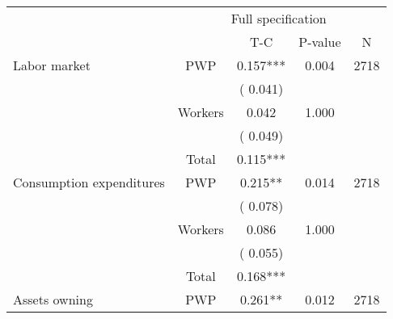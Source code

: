 
\begin{tabular}{l*{4}{c}}\hline&\multicolumn{4}{c}{Full specification} \\ \cmidrule(r){2-5} & {} & {T-C} & {P-value} & {N}  \\ \midrule
 Labor market                 &       PWP     &              0.157***                 &        0.004    & 2718                               \\  
                               &                               &       (       0.041)                              & &                                                                             \\ 
                               &       Workers         &              0.042                 &        1.000    &                                               \\ 
                               &                               &       (       0.049)                              & &                                                                             \\ 
\cmidrule{2-3}
                               &       Total           &              0.115***                 &    &                                               \\ 
\cmidrule{2-3}
 Consumption expenditures                 &       PWP     &              0.215**                 &        0.014    & 2718                               \\ 
                               &                               &       (       0.078)                              & &                                                                             \\ 
                               &       Workers         &              0.086                 &        1.000    &                                               \\ 
                               &                               &       (       0.055)                              & &                                                                             \\ 
\cmidrule{2-3}
                               &       Total           &              0.168***                 &    &                                               \\ 
\cmidrule{2-3}
 Assets owning                 &       PWP     &              0.261**                 &        0.012    & 2718                               \\ 

\end{tabular}
